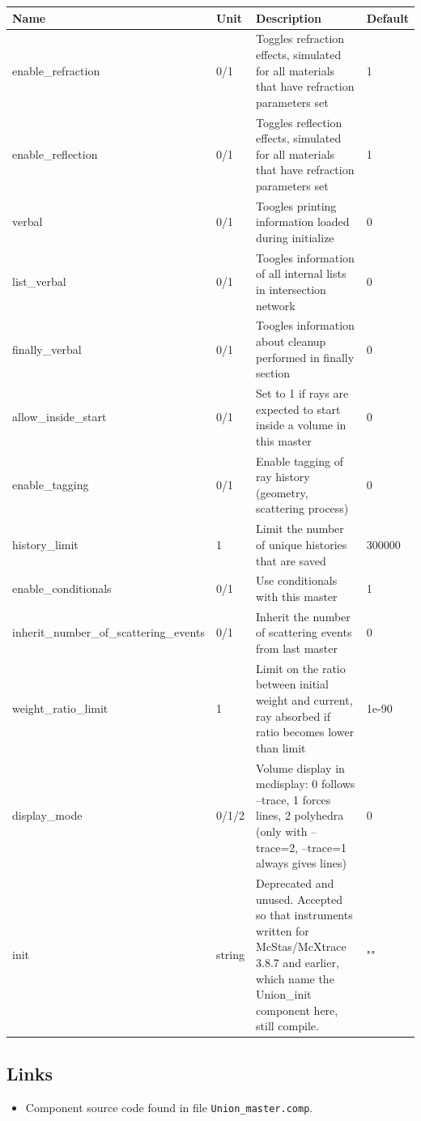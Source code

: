 \begin{longtable}{p{}p{}p{}p{}}
\toprule
\textbf{Name} & \textbf{Unit} & \textbf{Description} & \textbf{Default} \\
\midrule
\endhead
enable\_refraction & 0/1 & Toggles refraction effects, simulated for all materials that have refraction parameters set & 1 \\
enable\_reflection & 0/1 & Toggles reflection effects, simulated for all materials that have refraction parameters set & 1 \\
verbal & 0/1 & Toogles printing information loaded during initialize & 0 \\
list\_verbal & 0/1 & Toogles information of all internal lists in intersection network & 0 \\
finally\_verbal & 0/1 & Toogles information about cleanup performed in finally section & 0 \\
allow\_inside\_start & 0/1 & Set to 1 if rays are expected to start inside a volume in this master & 0 \\
enable\_tagging & 0/1 & Enable tagging of ray history (geometry, scattering process) & 0 \\
history\_limit & 1 & Limit the number of unique histories that are saved & 300000 \\
enable\_conditionals & 0/1 & Use conditionals with this master & 1 \\
inherit\_number\_of\_scattering\_events & 0/1 & Inherit the number of scattering events from last master & 0 \\
weight\_ratio\_limit & 1 & Limit on the ratio between initial weight and current, ray absorbed if ratio becomes lower than limit & 1e-90 \\
display\_mode & 0/1/2 & Volume display in mcdisplay: 0 follows --trace, 1 forces lines, 2 polyhedra (only with --trace=2, --trace=1 always gives lines) & 0 \\
init & string & Deprecated and unused. Accepted so that instruments written for McStas/McXtrace 3.8.7 and earlier, which name the Union\_init component here, still compile. & "" \\
\bottomrule
\end{longtable}

\subsection*{Links}
\begin{itemize}
  \item Component source code found in file \texttt{Union\_master.comp}.
\end{itemize}
